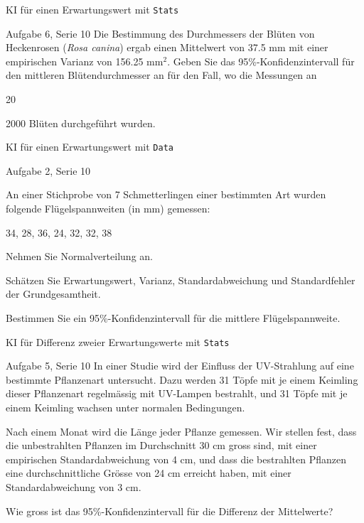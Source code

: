 \documentclass[handout]{beamer}
\begin{document}
\begin{frame}{KI für einen Erwartungswert mit \texttt{Stats}}
\begin{beamerboxesrounded}[shadow]{Aufgabe 6, Serie 10}
Die Bestimmung des Durchmessers der Blüten von Heckenrosen 
(\textit{Rosa canina}) ergab einen Mittelwert von 37.5 mm mit 
einer empirischen Varianz von 156.25 mm$^2$. Geben Sie
das 95\%-Konfidenzintervall für den mittleren Blütendurchmesser an 
für den Fall, wo die Messungen an 
\begin{outline}
\item 20 
\item 2000 Blüten durchgeführt wurden.
\end{outline}
\end{beamerboxesrounded}
\end{frame}

\begin{frame}{KI für einen Erwartungswert mit \texttt{Data}}
\begin{beamerboxesrounded}[shadow]{Aufgabe 2, Serie 10}

An einer Stichprobe von 7 Schmetterlingen einer bestimmten Art wurden folgende 
Flügelspannweiten (in mm) gemessen:

\begin{center}
34, 28, 36, 24, 32, 32, 38
\end{center}

Nehmen Sie Normalverteilung an.

\begin{outline}
\item Schätzen Sie Erwartungswert, Varianz, Standardabweichung und Standardfehler der Grundgesamtheit.
\item Bestimmen Sie ein 95\%-Konfidenzintervall für die mittlere Flügelspannweite.
\end{outline}
\end{beamerboxesrounded}
\end{frame}

\begin{frame}{KI für Differenz zweier Erwartungswerte mit \texttt{Stats}}
\begin{beamerboxesrounded}[shadow]{Aufgabe 5, Serie 10}
In einer Studie wird der Einfluss der UV-Strahlung auf eine bestimmte Pflanzenart 
untersucht. Dazu werden 31 Töpfe mit je einem Keimling dieser Pflanzenart regelmässig
mit UV-Lampen bestrahlt, und 31 Töpfe mit je einem Keimling wachsen unter normalen
Bedingungen.

Nach einem Monat wird die Länge jeder Pflanze gemessen. Wir stellen fest, dass die unbestrahlten 
Pflanzen im Durchschnitt 30 cm gross sind, mit einer empirischen Standardabweichung von 4 cm, 
und dass die bestrahlten Pflanzen eine durchschnittliche Grösse von 24 cm erreicht haben, mit 
einer Standardabweichung von 3 cm.

Wie gross ist das 95\%-Konfidenzintervall für die Differenz der Mittelwerte?
\end{beamerboxesrounded}
\end{frame}
\end{document}
